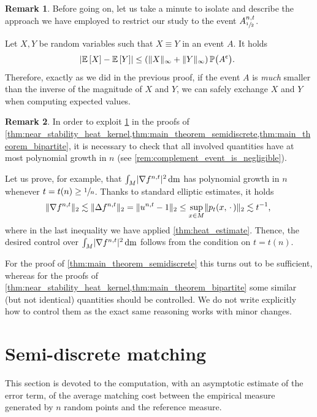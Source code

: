 \documentclass[10pt]{amsart}
\theoremstyle{plain}
\theoremstyle{definition}
\newtheorem{remark}[remark]{Remark}
\numberwithin{equation}{section}
\renewcommand{\complement}{\ensuremath{\mathsf{c}}}\newcommand{\de}{\ensuremath{\,\mathrm d}}
\newcommand{\E}[1]{\ensuremath{\operatorname{\mathbb{E}}\left[#1\right]}}
\newcommand{\emptyparam}{\ensuremath{\,\cdot\,}}
\newcommand{\lapl}{\ensuremath{\Delta}}
\newcommand{\bP}[1]{\ensuremath{\operatorname{\mathbb{P}}\bigl(#1\bigr)}}
\renewcommand{\comma}{\ensuremath{\text{, }}}
\newcommand{\comma}{\ensuremath{\text{, }}}
\newcommand{\fullstop}{\ensuremath{\text{. }}}
\newcommand{\m}{\ensuremath{\mathrm m}}
\DeclarePairedDelimiter\abs{\lvert}{\rvert}
\DeclarePairedDelimiter\norm{\lVert}{\rVert}
\begin{document}
\begin{remark}\label{rem:easy_restriction_rule}
Before going on, let us take a minute to isolate and describe the approach we have employed to
restrict our study to the event $A^{n,t}_{\sfrac12}$.

Let $X, Y$ be random variables such that $X\equiv Y$ in an event $A$. It holds
\begin{equation*}
\abs*{\E{X}-\E{Y}}
\le (\norm{X}_\infty+\norm{Y}_\infty)\bP{A^\complement} \fullstop
\end{equation*}
Therefore, exactly as we did in the previous proof, if the event $A$ is \emph{much} smaller than the inverse
of the magnitude of $X$ and $Y$, we can safely exchange $X$ and $Y$ when computing expected values.
\end{remark}
\begin{remark}
In order to exploit \cref{rem:easy_restriction_rule} in the proofs of
\cref{thm:near_stability_heat_kernel,thm:main_theorem_semidiscrete,thm:main_theorem_bipartite},
it is necessary to check that all involved quantities have at most polynomial growth in $n$
(see \cref{rem:complement_event_is_negligible}).

Let us prove, for example, that $\int_M \abs{\nabla f^{n,t}}^2\de\m$ has polynomial
growth in $n$ whenever $t=t(n)\ge \sfrac1n$. Thanks to standard elliptic estimates, it holds
\begin{equation*}
\norm{\nabla f^{n,t}}_2 \lesssim \norm{\lapl f^{n,t}}_2 = \norm{u^{n,t}-1}_2
\le \sup_{x\in M}\norm{p_t(x,\emptyparam)}_2 \lesssim t^{-1}\comma
\end{equation*}
where in the last inequality we have applied \cref{thm:heat_estimate}. Thence, the desired
control over $\int_M \abs{\nabla f^{n,t}}^2\de\m$ follows from the condition on $t=t(n)$.

For the proof of \cref{thm:main_theorem_semidiscrete} this turns out to be sufficient, whereas
for the proofs of \cref{thm:near_stability_heat_kernel,thm:main_theorem_bipartite} some similar
(but not identical) quantities should be controlled.
We do not write explicitly how to control them as the exact same reasoning works with minor
changes.
\end{remark}

\section{Semi-discrete matching}\label{sec:semidiscrete_matching}
This section is devoted to the computation, with an asymptotic estimate of the error term, of the average
matching cost between the empirical measure generated by $n$ random points and the reference measure.
\end{document}
